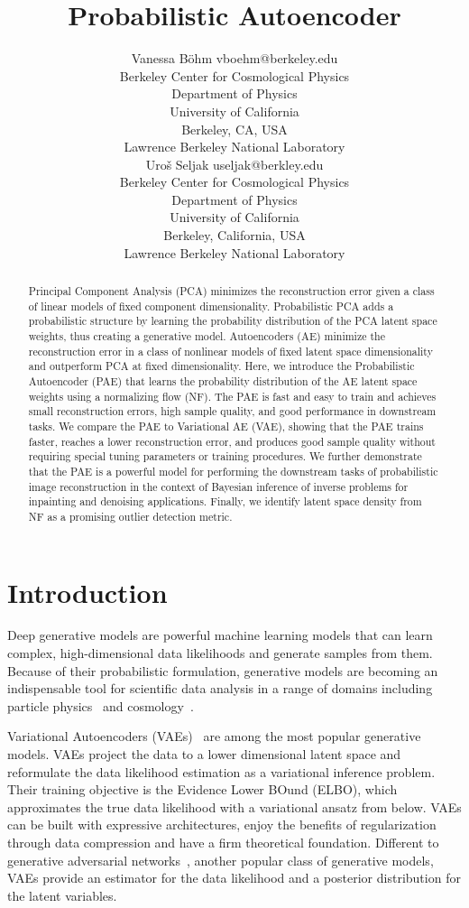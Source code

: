 \documentclass[10pt]{article} \usepackage[accepted]{tmlr}
\title{Probabilistic Autoencoder}
\author{\name Vanessa B\"ohm \email vboehm@berkeley.edu\\
        \addr Berkeley Center for Cosmological Physics\\
        Department of Physics\\
        University of California\\
        Berkeley, CA, USA\\
        Lawrence Berkeley National Laboratory\\
        \AND
        \name Uro\v s Seljak \email useljak@berkley.edu\\
        \addr Berkeley Center for Cosmological Physics\\
        Department of Physics\\
University of California\\
        Berkeley, California, USA\\
        Lawrence Berkeley National Laboratory}
\begin{document}
\maketitle

\begin{abstract}Principal Component Analysis (PCA) minimizes the reconstruction error given a class of linear models of fixed component dimensionality. Probabilistic PCA adds a probabilistic structure by learning the probability distribution of the PCA latent space weights, thus creating a generative model. Autoencoders (AE) minimize the reconstruction error in a class of nonlinear models of fixed latent space dimensionality and outperform PCA at fixed dimensionality. Here, we introduce the Probabilistic Autoencoder (PAE) that learns the probability distribution of the AE latent space weights using a normalizing flow (NF). The PAE is fast and easy to train and achieves small reconstruction errors, high sample quality, and good performance in downstream tasks. We compare the PAE to Variational AE (VAE), showing that the PAE trains faster, reaches a lower reconstruction error, and produces good sample quality without requiring special tuning parameters or training procedures. 
We further demonstrate that the PAE is a powerful model for performing the downstream tasks of probabilistic image reconstruction in the context of Bayesian inference of inverse problems for inpainting and denoising applications. Finally, we identify latent space density from NF as a promising outlier detection metric.
\end{abstract}

\section{Introduction}
Deep generative models are powerful machine learning models that can learn complex, high-dimensional data likelihoods and generate samples from them. Because of their probabilistic formulation, generative models are becoming an indispensable tool for scientific data analysis in a range of domains including particle physics~\citep{Paganini2018,LHC_competition} and cosmology~\citep{Thorne2021,Reiman2020}. 

Variational Autoencoders (VAEs)~\citep{ KingmaWelling13,RezendeMW14} are among the most popular generative models. VAEs project the data to a lower dimensional latent space and reformulate the data likelihood estimation as a variational inference problem. Their training objective is the Evidence Lower BOund (ELBO), which approximates the true data likelihood with a variational ansatz from below. VAEs can be built with expressive architectures, enjoy the benefits of regularization through data compression and have a firm theoretical foundation. Different to generative adversarial networks~\citep{GANs}, another popular class of generative models, VAEs provide an estimator for the data likelihood and a posterior distribution for the latent variables. 
\end{document}

